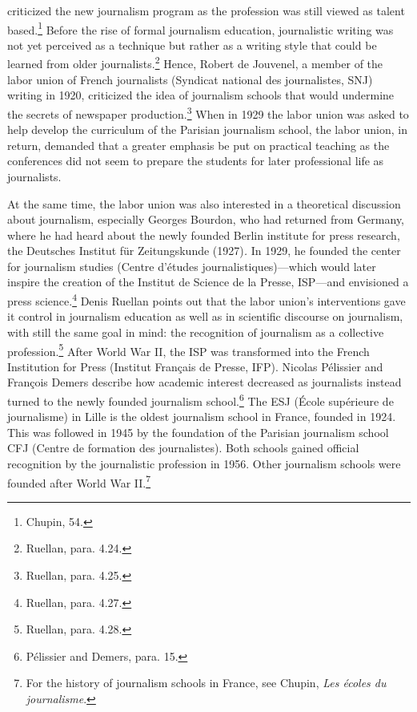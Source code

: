 \documentclass{tufte-handout}
\begin{document}
criticized the new journalism program as the profession was still viewed
as talent based.\footnote{Chupin, 54.} Before the rise of formal
journalism education, journalistic writing was not yet perceived as a
technique but rather as a writing style that could be learned from older
journalists.\footnote{Ruellan, para. 4.24.} Hence, Robert de Jouvenel, a
member of the labor union of French journalists (Syndicat national des
journalistes, SNJ) writing in 1920, criticized the idea of journalism
schools that would undermine the secrets of newspaper
production.\footnote{Ruellan, para. 4.25.} When in 1929 the labor union
was asked to help develop the curriculum of the Parisian journalism
school, the labor union, in return, demanded that a greater emphasis be
put on practical teaching as the conferences did not seem to prepare the
students for later professional life as journalists.

At the same time, the labor union was also interested in a theoretical
discussion about journalism, especially Georges Bourdon, who had
returned from Germany, where he had heard about the newly founded Berlin
institute for press research, the Deutsches Institut für Zeitungskunde
(1927)\emph{.} In 1929, he founded the center for journalism studies
(Centre d'études journalistiques)---which would later inspire the
creation of the Institut de Science de la Presse, ISP---and envisioned a
press science.\footnote{Ruellan, para. 4.27.} Denis Ruellan points out
that the labor union's interventions gave it control in journalism
education as well as in scientific discourse on journalism, with still
the same goal in mind: the recognition of journalism as a collective
profession.\footnote{Ruellan, para. 4.28.} After World War II, the ISP
was transformed into the French Institution for Press (Institut Français
de Presse, IFP). Nicolas Pélissier and François Demers describe how
academic interest decreased as journalists instead turned to the newly
founded journalism school.\footnote{Pélissier and Demers, para. 15.} The
ESJ (École supérieure de journalisme) in Lille is the oldest journalism
school in France, founded in 1924. This was followed in 1945 by the
foundation of the Parisian journalism school CFJ (Centre de formation
des journalistes). Both schools gained official recognition by the
journalistic profession in 1956. Other journalism schools were founded
after World War II.\footnote{For the history of journalism schools in
  France, see Chupin, \emph{Les écoles du journalisme}.}
\end{document}
